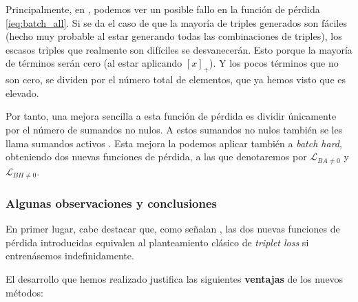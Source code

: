 Principalmente, en , podemos ver un posible fallo en la función de pérdida \eqref{ieq:batch_all}. Si se da el caso de que la mayoría de triples generados son fáciles (hecho muy probable al estar generando todas las combinaciones de triples), los escasos triples que realmente son difíciles se desvanecerán. Esto porque la mayoría de términos serán cero (al estar aplicando $[x]_+$). Y los pocos términos que no son cero, se dividen por el número total de elementos, que ya hemos visto que es elevado.

Por tanto, una mejora sencilla a esta función de pérdida es dividir únicamente por el número de sumandos no nulos. A estos sumandos no nulos también se les llama sumandos activos \cite{informatica:principal}. Esta mejora la podemos aplicar también a \textit{batch hard}, obteniendo dos nuevas funciones de pérdida, a las que denotaremos por $\mathcal{L}_{BA \neq 0}$ y $\mathcal{L}_{BH \neq 0}$.

\subsubsection{Algunas observaciones y conclusiones} \label{isubsubs:observaciones_conclusiones_pksampling}

En primer lugar, cabe destacar que, como señalan \cite{informatica:principal}, las dos nuevas funciones de pérdida introducidas equivalen al planteamiento clásico de \textit{triplet loss} si entrenásemos indefinidamente.

El desarrollo que hemos realizado justifica las siguientes \textbf{ventajas} de los nuevos métodos:

